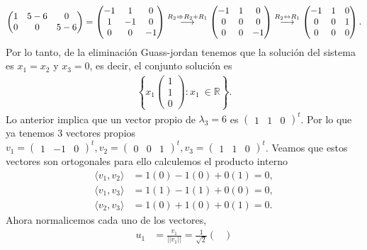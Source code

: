 \documentclass[11pt,letterpaper]{article}
\newcommand{\mR}{\mathbb{R}}
\newcommand{\grstep}[2][\relax]{%
   \ensuremath{\mathrel{
       {\mathop{\longrightarrow}\limits^{#2\mathstrut}_{
                                     \begin{subarray}{l} #1 \end{subarray}}}}}}
\begin{document}
\begin{enumerate}
\begin{align*}
\begin{pmatrix}
1 & 5-6 & 0\\
0 & 0 & 5-6
\end{pmatrix}=\begin{pmatrix}
-1 & 1 & 0\\
1 & -1 & 0\\
0 & 0 & -1
\end{pmatrix}%
\grstep[]{R_2 \Rightarrow R_2+R_1}
%
\begin{pmatrix}
-1 & 1 & 0\\
0 & 0 & 0\\
0 & 0 & -1
\end{pmatrix}
%
\grstep[]{R_2 \leftrightarrow R_1}
%
\begin{pmatrix}
-1 & 1 & 0\\
0 & 0 & 1\\
0 & 0 & 0
\end{pmatrix}.
\end{align*}
Por lo tanto, de la eliminación Guass-jordan tenemos que la solución del sistema es $x_1=x_2$ y $x_3=0$, es decir, el conjunto solución es
\begin{align*}
\left\{x_1\begin{pmatrix}
1\\
1\\
0
\end{pmatrix}: x_1 \ \in \mR \right\}.
\end{align*}
Lo anterior implica que un vector propio de $\lambda_3=6$ es 
$\begin{pmatrix}
1 & 1 & 0 
\end{pmatrix}^t$. Por lo que ya tenemos 3 vectores propios $v_1=\begin{pmatrix}
1 & -1 & 0
\end{pmatrix}^t, v_2=\begin{pmatrix}
0 & 0 & 1
\end{pmatrix}^t, v_3=\begin{pmatrix}
1 & 1 & 0 
\end{pmatrix}^t$. Veamos que estos vectores son ortogonales para ello calculemos el producto interno
\begin{align*}
\langle v_1, v_2 \rangle &= 1(0) -1(0)+0(1) = 0,\\
\langle v_1, v_3 \rangle &= 1(1)-1(1)+0(0)=0, \\
\langle v_2, v_3 \rangle &= 1(0)+1(0)+0(1)=0.
\end{align*}
Ahora normalicemos cada uno de los vectores, 
\begin{align*}
u_1&= \frac{v_1}{||v_1||} =\frac{1}{\sqrt{2}} \begin{pmatrix}

\end{pmatrix}
\end{align*}
\end{enumerate}
\end{document}
